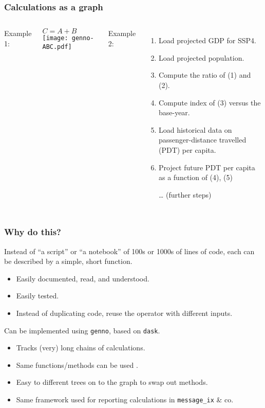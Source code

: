 \documentclass[12pt,aspectratio=169]{beamer}
\begin{document}
\begin{frame}
\frametitle{Calculations as a graph}
\begin{columns}[T]
Example 1:

\medskip
{\LARGE $C = A + B$}
\texttt{[image: genno-ABC.pdf]}

Example 2:
\begin{enumerate}
  \item Load projected GDP for SSP4.
  \item Load projected population.
  \item Compute the ratio of (1) and (2).
  \item Compute index of (3) versus the base-year.
  \item Load historical data on passenger-distance travelled (PDT) per capita.
  \item Project future PDT per capita as a function of (4), (5)
  \item […] (further steps)
\end{enumerate}
\end{columns}
\end{frame}

\begin{frame}
\frametitle{Why do this?}
Instead of “a script” or “a notebook” of 100s or 1000s of lines of code, each  can be described by a simple, short function.
\begin{itemize}
  \item Easily documented, read, and understood.
  \item Easily tested.
  \item Instead of duplicating code, reuse the operator with different inputs.
\end{itemize}

\medskip
Can be implemented using \texttt{genno}, based on \texttt{dask}.
\begin{itemize}
  \item Tracks (very) long chains of calculations.
  \item Same functions/methods can be used .
  \item Easy to  different trees on to the graph to swap out methods.
  \item Same framework used for reporting calculations in \texttt{message\_ix} \& co.
\end{itemize}
\end{frame}
\end{document}
